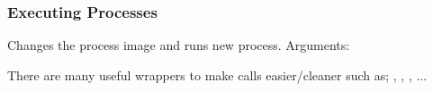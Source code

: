 \documentclass{report}
\begin{document}
        \subsubsection*{Executing Processes}
            
            Changes the process image and runs new process.
            Arguments:
            \begin{itemize}
            \end{itemize}
            There are many useful wrappers to make calls easier/cleaner such as; , , , ...
\end{document}
